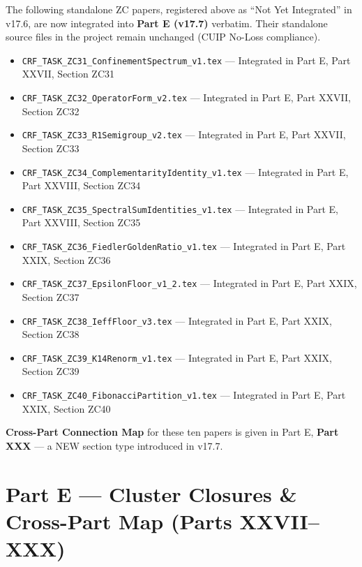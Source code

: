 \documentclass[11pt, a4paper]{article}
\begin{document}
\begin{contentsbox}[title={ZC Papers Now Integrated into Part E (v17.7)}]
The following standalone ZC papers, registered above as
``Not Yet Integrated'' in v17.6, are now integrated into
\textbf{Part E (v17.7)} verbatim. Their standalone source files
in the project remain unchanged (CUIP No-Loss compliance).

\begin{itemize}[noitemsep,leftmargin=1.5em]
  \item \texttt{CRF\_TASK\_ZC31\_ConfinementSpectrum\_v1.tex}
    --- Integrated in Part E, Part XXVII, Section ZC31
  \item \texttt{CRF\_TASK\_ZC32\_OperatorForm\_v2.tex}
    --- Integrated in Part E, Part XXVII, Section ZC32
  \item \texttt{CRF\_TASK\_ZC33\_R1Semigroup\_v2.tex}
    --- Integrated in Part E, Part XXVII, Section ZC33
  \item \texttt{CRF\_TASK\_ZC34\_ComplementarityIdentity\_v1.tex}
    --- Integrated in Part E, Part XXVIII, Section ZC34
  \item \texttt{CRF\_TASK\_ZC35\_SpectralSumIdentities\_v1.tex}
    --- Integrated in Part E, Part XXVIII, Section ZC35
  \item \texttt{CRF\_TASK\_ZC36\_FiedlerGoldenRatio\_v1.tex}
    --- Integrated in Part E, Part XXIX, Section ZC36
  \item \texttt{CRF\_TASK\_ZC37\_EpsilonFloor\_v1\_2.tex}
    --- Integrated in Part E, Part XXIX, Section ZC37
  \item \texttt{CRF\_TASK\_ZC38\_IeffFloor\_v3.tex}
    --- Integrated in Part E, Part XXIX, Section ZC38
  \item \texttt{CRF\_TASK\_ZC39\_K14Renorm\_v1.tex}
    --- Integrated in Part E, Part XXIX, Section ZC39
  \item \texttt{CRF\_TASK\_ZC40\_FibonacciPartition\_v1.tex}
    --- Integrated in Part E, Part XXIX, Section ZC40
\end{itemize}

\textbf{Cross-Part Connection Map} for these ten papers is given in
Part E, \textbf{Part XXX} --- a NEW section type introduced in v17.7.
\end{contentsbox}

\newpage

\section{Part E --- Cluster Closures \& Cross-Part Map (Parts XXVII--XXX)}
\end{document}
